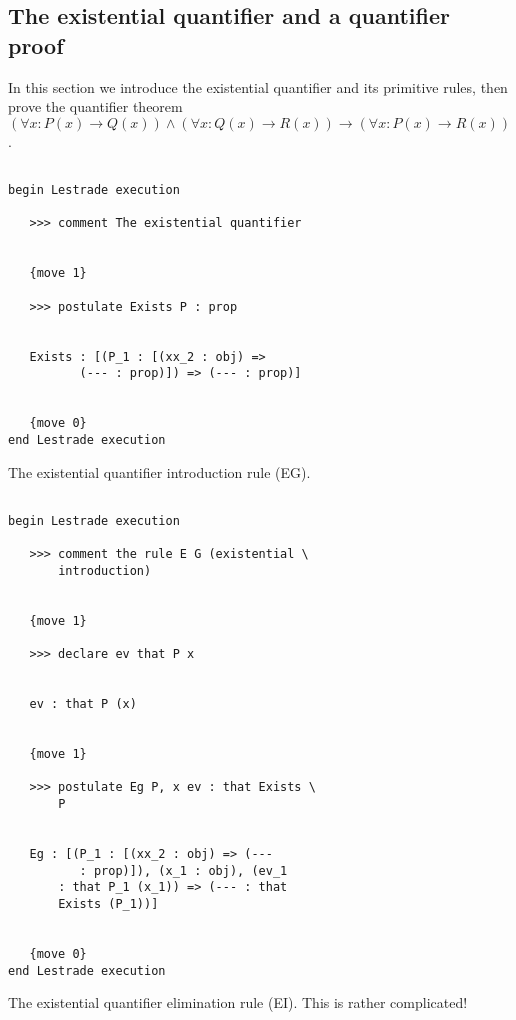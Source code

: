 \documentclass[12pt]{article}
\begin{document}
\subsection{The existential quantifier and a quantifier proof}

In this section we introduce the existential quantifier and its primitive rules, then prove the quantifier theorem $(\forall x:P(x) \rightarrow Q(x)) \wedge (\forall x:Q(x) \rightarrow R(x)) \rightarrow (\forall x:P(x) \rightarrow R(x))$.

\begin{verbatim}

begin Lestrade execution

   >>> comment The existential quantifier


   {move 1}

   >>> postulate Exists P : prop


   Exists : [(P_1 : [(xx_2 : obj) => 
          (--- : prop)]) => (--- : prop)]


   {move 0}
end Lestrade execution
\end{verbatim}

The existential quantifier introduction rule (EG).

\begin{verbatim}

begin Lestrade execution

   >>> comment the rule E G (existential \
       introduction)


   {move 1}

   >>> declare ev that P x


   ev : that P (x)


   {move 1}

   >>> postulate Eg P, x ev : that Exists \
       P


   Eg : [(P_1 : [(xx_2 : obj) => (--- 
          : prop)]), (x_1 : obj), (ev_1 
       : that P_1 (x_1)) => (--- : that 
       Exists (P_1))]


   {move 0}
end Lestrade execution
\end{verbatim}

The existential quantifier elimination rule (EI).  This is rather complicated!
\end{document}
